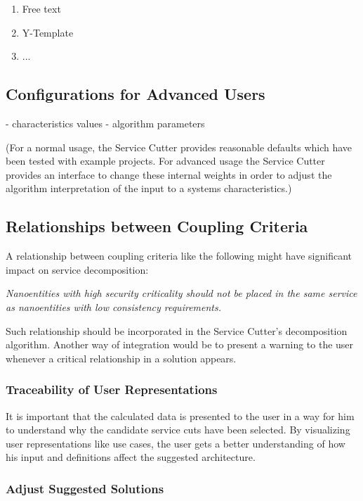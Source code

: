 \begin{enumerate}
	\item Free text
	\item Y-Template\cite{zimmermann2012yTemplate}
	\item ... %
\end{enumerate}

\subsection{Configurations for Advanced Users}

- characteristics values
- algorithm parameters

(For a normal usage, the Service Cutter provides reasonable defaults which have been tested with example projects. For advanced usage the Service Cutter provides an interface to change these internal weights in order to adjust the algorithm interpretation of the input to a systems characteristics.) 


\subsection{Relationships between Coupling Criteria}

A relationship between coupling criteria like the following might have significant impact on service decomposition:

\textit{Nanoentities with high security criticality should not be placed in the same service as nanoentities with low consistency requirements.}

Such relationship should be incorporated in the Service Cutter's decomposition algorithm. Another way of integration would be to present a warning to the user whenever a critical relationship in a solution appears.

\subsubsection{Traceability of User Representations}

It is important that the calculated data is presented to the user in a way for him to understand why the candidate service cuts have been selected. By visualizing user representations like use cases, the user gets a better understanding of how his input and definitions affect the suggested architecture. 

\subsubsection{Adjust Suggested Solutions}

